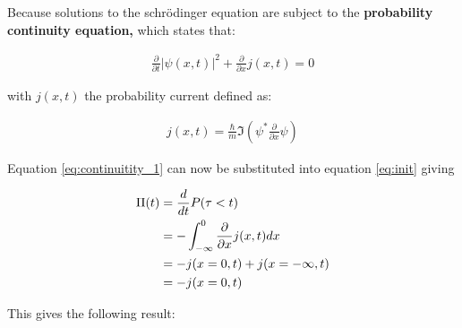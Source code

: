 Because solutions to the schrödinger equation are subject to the \textbf{probability continuity equation,} which states that:

\begin{align}
    \frac{\partial}{\partial t} |\psi(x,t)|^2 + \frac{\partial}{\partial x} j(x,t) = 0
\end{align}

with $j(x,t)$ the probability current defined as:

\begin{align}
    \label{eq:continuitity_1}
    j(x,t) = \frac{\hbar}{m} \Im \left( \psi^* \frac{\partial}{\partial x} \psi \right)
\end{align}

Equation \ref{eq:continuitity_1} can now be substituted into equation \ref{eq:init} giving

\begin{align}
    \label{eq:continuitity_1}
    \Pi(t) &= \frac{d}{dt} P(\tau < t) \\
    &= - \int^0_{-\infty} \frac{\partial}{\partial x} j(x,t) \space dx \\
    &= - j(x=0, t) + j(x= -\infty, t)\\
    &= - j(x=0, t)
\end{align}

This gives the following result:



